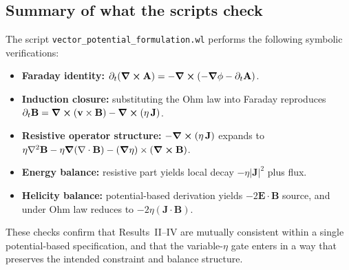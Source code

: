 \documentclass[11pt]{article}
\theoremstyle{plain}
\theoremstyle{definition}
\theoremstyle{remark}
\newcommand{\diver}{\nabla\cdot}
\newcommand{\A}{\mathbf{A}}
\newcommand{\B}{\mathbf{B}}
\newcommand{\E}{\mathbf{E}}
\newcommand{\J}{\mathbf{J}}
\newcommand{\vfield}{\mathbf{v}}
\begin{document}
\subsection{Summary of what the scripts check}
The script \texttt{vector\_potential\_formulation.wl} performs the following symbolic verifications:

\begin{itemize}[leftmargin=*]
  \item \textbf{Faraday identity:} $\partial_t(\curl\A) = -\curl(-\grad\phi-\partial_t\A)$.
  \item \textbf{Induction closure:} substituting the Ohm law into Faraday reproduces
  $\partial_t\B=\curl(\vfield\times\B)-\curl(\eta\,\J)$.
  \item \textbf{Resistive operator structure:} $-\curl(\eta\,\J)$ expands to
  $\eta\nabla^2\B-\eta\grad(\diver\B)-(\grad\eta)\times(\curl\B)$.
  \item \textbf{Energy balance:} resistive part yields local decay $-\eta|\J|^2$ plus flux.
  \item \textbf{Helicity balance:} potential-based derivation yields $-2\E\cdot\B$ source, and under
  Ohm law reduces to $-2\eta(\J\cdot\B)$.
\end{itemize}

These checks confirm that Results~II--IV are mutually consistent within a single potential-based
specification, and that the variable-$\eta$ gate enters in a way that preserves the intended constraint
and balance structure.
\end{document}
